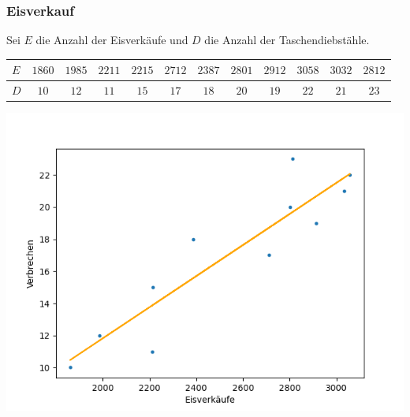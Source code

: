 \documentclass{beamer}
\begin{document}
\begin{frame}
\frametitle{Eisverkauf}

Sei $E$ die Anzahl der Eisverkäufe und $D$ die Anzahl der Taschendiebstähle.

\begin{tiny}
\begin{center}
\begin{tabular}{| l | c | c | c | c | c | c | c | c | c | c | c |}
\hline
$E$ & $1860$ & $1985$ & $2211$ & $2215$ & $2712$ & $2387$ & $2801$ & $2912$ & $3058$ & $3032$ & $2812$\\
\hline
$D$ & $10$ & $12$ & $11$ & $15$ & $17$ & $18$ & $20$ & $19$ & $22$ & $21$ & $23$\\
\hline
\end{tabular}
\end{center}
\end{tiny}

\pause

\begin{center}
	\includegraphics[width=0.5\linewidth]{Eisverkäufe vs Taschendiebstähle.png}
\end{center}
\end{frame}
\end{document}
